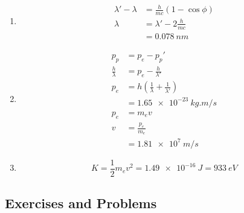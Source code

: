 \documentclass{article}
\begin{document}
\subsubsection{}

\begin{enumerate}
  \item

        \begin{align*}
          \lambda' - \lambda & = \frac{h}{m c} (1 - \cos \phi) \\
          \lambda            & = \lambda' - 2 \frac{h}{m c}    \\
                             & = \qty{0.078}{nm}
        \end{align*}

  \item

        \begin{align*}
          p_p               & = p_e - p_p'                                              \\
          \frac{h}{\lambda} & = p_e - \frac{h}{\lambda'}                                \\
          p_e               & = h \left( \frac{1}{\lambda} + \frac{1}{\lambda'} \right) \\
                            & = \qty{1.65e-23}{kg.m/s}                                  \\
          p_e               & = m_e v                                                   \\
          v                 & = \frac{p_e}{m_e}                                         \\
                            & = \qty{1.81e7}{m/s}
        \end{align*}

  \item

        \[K = \frac{1}{2} m_e v^2 = \qty{1.49e-16}{J} = \qty{933}{eV}\]
\end{enumerate}

\subsection{Exercises and Problems}

\subsubsection{}
\end{document}
